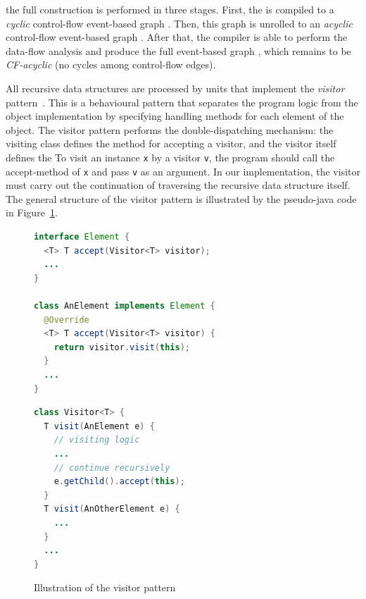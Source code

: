 the full \xgraph{} construction is performed in three stages.
First, the \ytree{} is compiled to a \textit{cyclic} control-flow event-based graph \xgraph[CF].
Then, this graph is unrolled to an \textit{acyclic} control-flow event-based graph \xgraphU[CF].
After that, the compiler is able to perform the data-flow analysis and produce the full event-based graph \xgraphU[CF+DF], which remains to be \textit{CF-acyclic} (no cycles among control-flow edges).



All recursive data structures are processed by units that implement the \textit{visitor} pattern~\cite{palsberg1998essence}.
This is a behavioural pattern that separates the program logic from the object implementation by specifying handling methods for each element of the object.
The visitor pattern performs the double-dispatching mechanism: the visiting class defines the method for accepting a visitor, and the visitor itself defines the 
To visit an instance \lstinline{x} by a visitor \lstinline{v}, the program should call the accept-method of \lstinline{x} and pass \lstinline{v} as an argument.
In our implementation, the visitor must carry out the continuation of traversing the recursive data structure itself.
The general structure of the visitor pattern is illustrated by the pseudo-java code in Figure~\ref{fig:visitor}.

\begin{figure}[h]
\centering
\begin{minipage}[t]{.55\textwidth}
\begin{lstlisting}[language=java]
interface Element {
  <T> T accept(Visitor<T> visitor);
  ...
}

class AnElement implements Element {
  @Override
  <T> T accept(Visitor<T> visitor) {
    return visitor.visit(this);
  }
  ...
}
\end{lstlisting}
\end{minipage}%
\begin{minipage}[t]{.45\textwidth}
\begin{lstlisting}[language=java]
class Visitor<T> {
  T visit(AnElement e) {
    // visiting logic
    ...
    // continue recursively
    e.getChild().accept(this);
  }
  T visit(AnOtherElement e) {
    ...
  }
  ...
}
\end{lstlisting}
\end{minipage}
\caption{Illustration of the visitor pattern}
\label{fig:visitor}
\end{figure}

